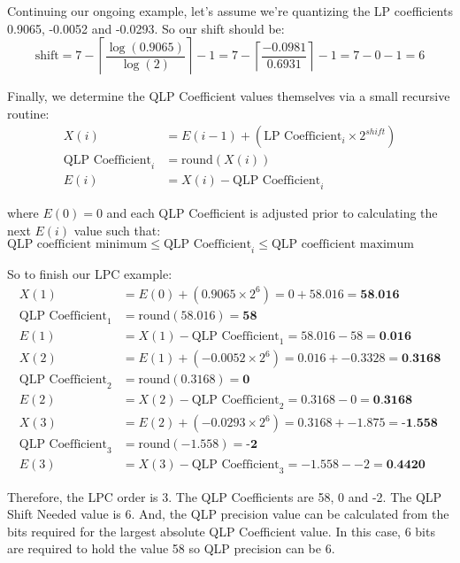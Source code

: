 Continuing our ongoing example, let's assume we're quantizing the LP
coefficients 0.9065, -0.0052 and -0.0293.  So our shift should be:
\begin{equation*}
\text{shift} = 7 - \left \lceil \frac{\log(0.9065)}{\log(2)} \right \rceil - 1
= 7 - \left \lceil \frac{-0.0981}{0.6931} \right \rceil - 1 = 7 - 0 - 1 = 6
\end{equation*}
\par
\noindent
Finally, we determine the QLP Coefficient values themselves via a small
recursive routine:
\begin{align}
X(i) &= E(i - 1) + (\text{LP Coefficient}_i \times 2 ^ {shift}) \\
\text{QLP Coefficient}_i &= \text{round}(X(i)) \\
E(i) &= X(i) - \text{QLP Coefficient}_i
\end{align}
\par
\noindent
where $E(0) = 0$ and each QLP Coefficient is adjusted
prior to calculating the next $E(i)$ value such that:
$\text{QLP coefficient minimum} \leq \text{QLP Coefficient}_i \leq \text{QLP coefficient maximum}$

\pagebreak

So to finish our LPC example:
\begin{align*}
X(1) &= E(0) + (0.9065 \times 2 ^ 6 ) = 0 + 58.016 = \textbf{58.016} \\
\text{QLP Coefficient}_1 &= \text{round}(58.016) = \textbf{58} \\
E(1) &= X(1) - \text{QLP Coefficient}_1 = 58.016 - 58 = \textbf{0.016} \\
X(2) &= E(1) + (-0.0052 \times 2 ^ 6 ) = 0.016 + -0.3328 = \textbf{0.3168} \\
\text{QLP Coefficient}_2 &= \text{round}(0.3168) = \textbf{0} \\
E(2) &= X(2) - \text{QLP Coefficient}_2 = 0.3168 - 0 = \textbf{0.3168} \\
X(3) &= E(2) + (-0.0293 \times 2 ^ 6 ) = 0.3168 + -1.875 = \textbf{-1.558} \\
\text{QLP Coefficient}_3 &= \text{round}(-1.558) = \textbf{-2} \\
E(3) &= X(3) - \text{QLP Coefficient}_3 = -1.558 - -2 = \textbf{0.4420}
\end{align*}
\par
\noindent
Therefore, the LPC order is 3.
The QLP Coefficients are 58, 0 and -2.
The QLP Shift Needed value is 6.
And, the QLP precision value can be calculated from the bits required
for the largest absolute QLP Coefficient value.
In this case, 6 bits are required to hold the value 58 so
QLP precision can be 6.


